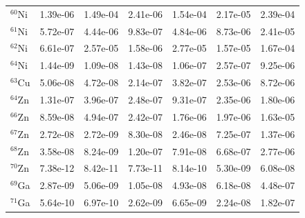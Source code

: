 \begin{table}
\begin{tabular}{l|cc|cc|cc}
$^{60}$Ni & 1.39e-06 & 1.49e-04 & 2.41e-06 & 1.54e-04 & 2.17e-05 & 2.39e-04\\
$^{61}$Ni & 5.72e-07 & 4.44e-06 & 9.83e-07 & 4.84e-06 & 8.73e-06 & 2.41e-05\\
$^{62}$Ni & 6.61e-07 & 2.57e-05 & 1.58e-06 & 2.77e-05 & 1.57e-05 & 1.67e-04\\
$^{64}$Ni & 1.44e-09 & 1.09e-08 & 1.43e-08 & 1.06e-07 & 2.57e-07 & 9.25e-06\\
$^{63}$Cu & 5.06e-08 & 4.72e-08 & 2.14e-07 & 3.82e-07 & 2.53e-06 & 8.72e-06\\
$^{64}$Zn & 1.31e-07 & 3.96e-07 & 2.48e-07 & 9.31e-07 & 2.35e-06 & 1.80e-06\\
$^{66}$Zn & 8.59e-08 & 4.94e-07 & 2.42e-07 & 1.76e-06 & 1.97e-06 & 1.63e-05\\
$^{67}$Zn & 2.72e-08 & 2.72e-09 & 8.30e-08 & 2.46e-08 & 7.25e-07 & 1.37e-06\\
$^{68}$Zn & 3.58e-08 & 8.24e-09 & 1.20e-07 & 7.91e-08 & 6.68e-07 & 2.77e-06\\
$^{70}$Zn & 7.38e-12 & 8.42e-11 & 7.73e-11 & 8.14e-10 & 5.30e-09 & 6.08e-08\\
$^{69}$Ga & 2.87e-09 & 5.06e-09 & 1.05e-08 & 4.93e-08 & 6.18e-08 & 4.48e-07\\
$^{71}$Ga & 5.64e-10 & 6.97e-10 & 2.62e-09 & 6.65e-09 & 2.24e-08 & 1.82e-07\\
\hline
\end{tabular}
\end{table}
\newpage


